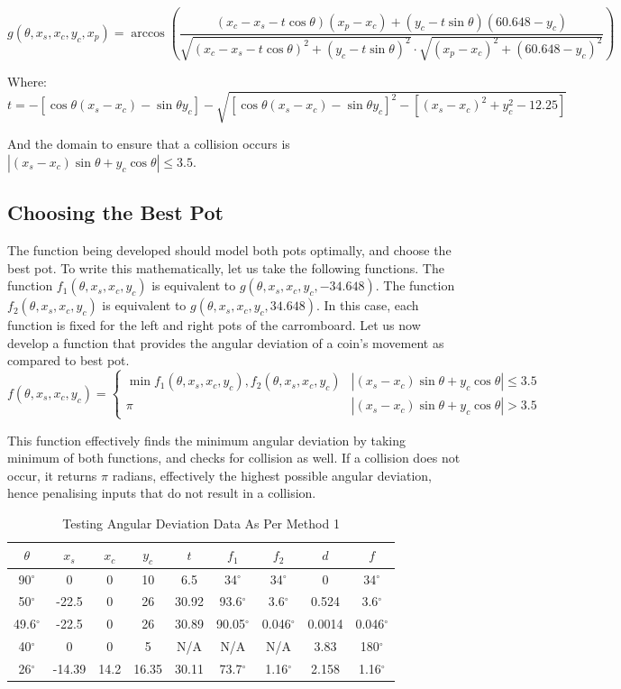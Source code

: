 \documentclass[10pt]{article}
\begin{document}
\[
g(\theta,x_s,x_c,y_c,x_p) = \arccos\left(\frac{(x_c-x_s-t\cos\theta)(x_p - x_c)+(y_c-t\sin\theta)(60.648 - y_c)}{\sqrt{
(x_c-x_s-t\cos\theta)^2 + (y_c-t\sin\theta)^2
}\cdot \sqrt{
(x_p - x_c)^2 + (60.648 - y_c)^2
}}\right) 
\]

Where:
\[
t = -\left[\cos \theta (x_s - x_c) - \sin \theta y_c\right] 
- 
\sqrt{
\left[\cos \theta (x_s - x_c) - \sin \theta y_c\right]^2 
- 
\left[(x_s - x_c)^2 + y_c^2 - 12.25\right]
}
\]

And the domain to ensure that a collision occurs is $|(x_s - x_c)\sin\theta+y_c\cos\theta| \leq 3.5$.

\subsection{Choosing the Best Pot}
The function being developed should model both pots optimally, and choose the best pot. To write this mathematically, let us take the following functions.
The function $f_1(\theta,x_s,x_c,y_c)$ is equivalent to $g(\theta,x_s,x_c,y_c,-34.648)$.
The function $f_2(\theta,x_s,x_c,y_c)$ is equivalent to $g(\theta,x_s,x_c,y_c,34.648)$.
In this case, each function is fixed for the left and right pots of the carromboard. Let us now develop a function that provides the angular deviation of a coin's movement as compared to best pot.
\[f(\theta,x_s,x_c,y_c) = 
\begin{cases}
\min{f_1(\theta,x_s,x_c,y_c),f_2(\theta,x_s,x_c,y_c)} & |(x_s - x_c)\sin\theta+y_c\cos\theta| \leq 3.5 \\
\pi & |(x_s - x_c)\sin\theta+y_c\cos\theta| > 3.5
\end{cases}\]

This function effectively finds the minimum angular deviation by taking minimum of both functions, and checks for collision as well. If a collision does not occur, it returns $\pi$ radians, effectively the highest possible angular deviation, hence penalising inputs that do not result in a collision.

\begin{table}[h]
    \centering
    \begin{tabular}{ccccccccc}
        \hline
        $\theta$ & $x_s$ & $x_c$ & $y_c$ & $t$ & $f_1$ & $f_2$ & $d$ & $f$ \\
        \hline
        90$^{\circ}$ & 0 & 0 & 10 & 6.5 & 34$^{\circ}$ & 34$^{\circ}$ & 0 & 34$^{\circ}$\\
        50$^{\circ}$ & -22.5 & 0 & 26 & 30.92 & 93.6$^{\circ}$ & 3.6$^{\circ}$ & 0.524 & 3.6$^{\circ}$\\
        49.6$^{\circ}$ & -22.5 & 0 & 26 & 30.89 & 90.05$^{\circ}$ & 0.046$^{\circ}$ & 0.0014 & 0.046$^{\circ}$\\
        40$^{\circ}$ & 0 & 0 & 5 & N/A & N/A & N/A & 3.83 & 180$^{\circ}$\\
        26$^{\circ}$ & -14.39 & 14.2 & 16.35 & 30.11 & 73.7$^{\circ}$ & 1.16$^{\circ}$ & 2.158 & 1.16$^{\circ}$\\
        \hline
    \end{tabular}
    \caption{Testing Angular Deviation Data As Per Method 1}
    \label{tab:collision_data}
\end{table}
\end{document}
